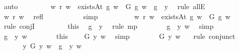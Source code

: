 \begin{isabellebody}
\ auto\isanewline
\ \ \ \ \ \ \isamarkupfalse%
\ {}{\isacharcolon}\ {\isachardoublequoteopen}{\isacharparenleft}w\ r\ w\ {\isasymand}\ existsAt\ g\ w\ {\isasymand}\ G\ g\ w{\isacharparenright}\ {\isasymlongrightarrow}\ g\ {\isacharequal}\ y{\isachardoublequoteclose}\ \isamarkupfalse%
\ {\isacharparenleft}rule\ allE{\isacharparenright}\isanewline
\ \ \ \ \ \ \isamarkupfalse%
\ {\isachardoublequoteopen}w\ r\ w{\isachardoublequoteclose}\ \isamarkupfalse%
\ refl\ \isanewline
\ \ \ \ \ \ \ \ \isamarkupfalse%
\ simp\ %
\isanewline
\ \ \ \ \ \ \isamarkupfalse%
\ \ {\isachardoublequoteopen}w\ r\ w\ {\isasymand}\ {\isacharparenleft}existsAt\ g\ w\ {\isasymand}\ G\ g\ w{\isacharparenright}{\isachardoublequoteclose}\ \isamarkupfalse%
\ {}\ \isamarkupfalse%
\ {\isacharparenleft}rule\ conjI{\isacharparenright}\isanewline
\ \ \ \ \ \ \isamarkupfalse%
\ {}\ this\ \isamarkupfalse%
\ {\isachardoublequoteopen}g\ {\isacharequal}\ y{\isachardoublequoteclose}\ \isamarkupfalse%
\ {\isacharparenleft}rule\ mp{\isacharparenright}\isanewline
\ \ \ \ \ \ \isamarkupfalse%
\ {\isachardoublequoteopen}{\isacharparenleft}g\ \isactrlbold {\isasymapprox}\ y{\isacharparenright}\ w{\isachardoublequoteclose}\ \isamarkupfalse%
\ simp\isanewline
\ \ \ \ \isamarkupfalse%
\isanewline
\ \ \ \ \ \ \isamarkupfalse%
\ {\isachardoublequoteopen}{\isacharparenleft}g\ \isactrlbold {\isasymapprox}\ y{\isacharparenright}\ w{\isachardoublequoteclose}\isanewline
\ \ \ \ \ \ \isamarkupfalse%
\ this\ {}\ \isamarkupfalse%
\ {\isachardoublequoteopen}{\isasymE}\ G\ y\ w{\isachardoublequoteclose}\ \isamarkupfalse%
\ simp\isanewline
\ \ \ \ \ \ \isamarkupfalse%
\ {\isachardoublequoteopen}G\ y\ w\ {\isachardoublequoteclose}\ \isamarkupfalse%
\ {\isacharparenleft}rule\ conjunct{}{\isacharparenright}\isanewline
\ \ \ \ \isamarkupfalse%
\isanewline
\ \ \isacommand{{\isacharbraceright}}\isamarkupfalse%
\isanewline
\ \ \isamarkupfalse%
\ {\isachardoublequoteopen}{\isasymforall}y{\isachardot}\ G\ y\ w\ {\isasymlongleftrightarrow}\ {\isacharparenleft}g\ \isactrlbold {\isasymapprox}\ y{\isacharparenright}\ w{\isachardoublequoteclose}\ \isamarkupfalse%

\end{isabellebody}

